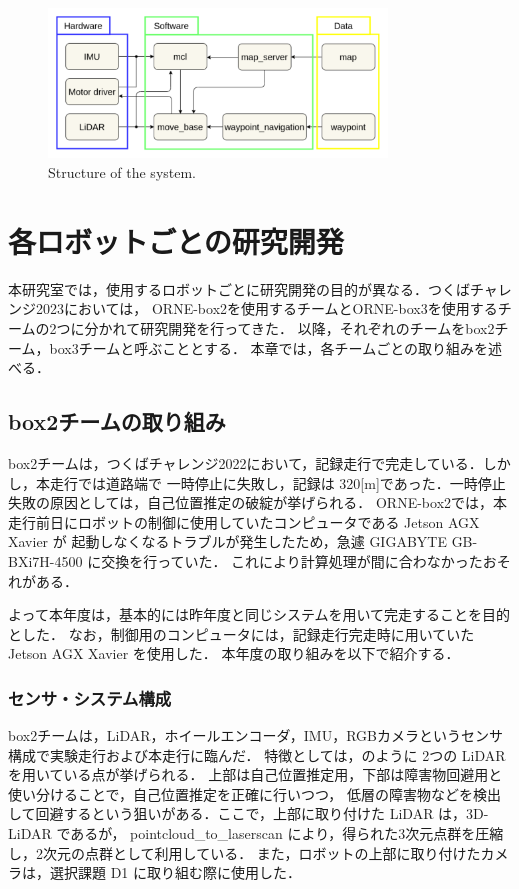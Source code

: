 \documentclass[twocolumn, 9pt]{jsproceedings}
\begin{document}
\begin{figure}[h!]
  \centering
  \includegraphics[width=90mm]{fig/software.pdf}
  \caption{Structure of the system.}
  \label{fig:soft-fig}
\end{figure}

\vspace*{2mm}

\section{各ロボットごとの研究開発}
本研究室では，使用するロボットごとに研究開発の目的が異なる．つくばチャレンジ2023においては，
ORNE-box2を使用するチームとORNE-box3を使用するチームの2つに分かれて研究開発を行ってきた．
以降，それぞれのチームをbox2チーム，box3チームと呼ぶこととする．
本章では，各チームごとの取り組みを述べる．

\subsection{box2チームの取り組み}
box2チームは，つくばチャレンジ2022において，記録走行で完走している．しかし，本走行では道路端で
一時停止に失敗し，記録は 320[m]であった．一時停止失敗の原因としては，自己位置推定の破綻が挙げられる．
ORNE-box2では，本走行前日にロボットの制御に使用していたコンピュータである Jetson AGX Xavier が
起動しなくなるトラブルが発生したため，急遽 GIGABYTE GB-BXi7H-4500 に交換を行っていた．
これにより計算処理が間に合わなかったおそれがある．

よって本年度は，基本的には昨年度と同じシステムを用いて完走することを目的とした．
なお，制御用のコンピュータには，記録走行完走時に用いていた Jetson AGX Xavier を使用した．
本年度の取り組みを以下で紹介する．

\subsubsection{センサ・システム構成}
box2チームは，LiDAR，ホイールエンコーダ，IMU，RGBカメラというセンサ構成で実験走行および本走行に臨んだ．
特徴としては，のように 2つの LiDAR を用いている点が挙げられる．
上部は自己位置推定用，下部は障害物回避用と使い分けることで，自己位置推定を正確に行いつつ，
低層の障害物などを検出して回避するという狙いがある．ここで，上部に取り付けた LiDAR は，3D-LiDAR であるが，
pointcloud\_to\_laserscan\cite{pointcloud} により，得られた3次元点群を圧縮し，2次元の点群として利用している．
また，ロボットの上部に取り付けたカメラは，選択課題 D1 に取り組む際に使用した．
\end{document}
